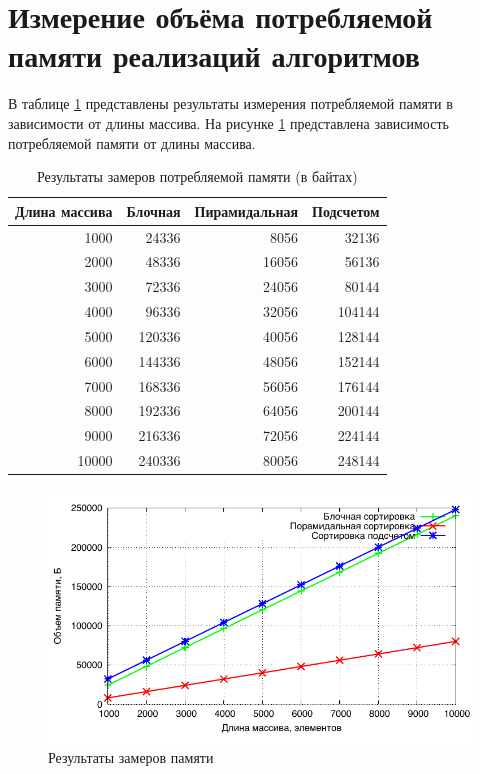 \section{Измерение объёма потребляемой памяти реализаций алгоритмов}

В таблице \ref{table:memory} представлены результаты измерения потребляемой памяти в зависимости от длины массива. На рисунке \ref{img:memory} представлена зависимость потребляемой памяти от длины массива.

\begin{table}[h]
  \caption{\label{table:memory} Результаты замеров потребляемой памяти (в байтах)}
  \begin{center}
    \begin{tabular}{|r|r|r|r|}
      \hline
      Длина массива & Блочная & Пирамидальная & Подсчетом\\ \hline
1000 & 24336 & 8056 & 32136 \\ \hline 
2000 & 48336 & 16056 & 56136 \\ \hline 
3000 & 72336 & 24056 & 80144 \\ \hline 
4000 & 96336 & 32056 & 104144 \\ \hline 
5000 & 120336 & 40056 & 128144 \\ \hline 
6000 & 144336 & 48056 & 152144 \\ \hline 
7000 & 168336 & 56056 & 176144 \\ \hline 
8000 & 192336 & 64056 & 200144 \\ \hline 
9000 & 216336 & 72056 & 224144 \\ \hline 
10000 & 240336 & 80056 & 248144 \\ \hline 

    \end{tabular}
  \end{center}
\end{table}

\noindent
\begin{figure}[h!]
	\centering
    \includegraphics[width=0.7\linewidth]{../data/memory.pdf}
    \caption{Результаты замеров памяти}
    \label{img:memory}
\end{figure}

\newpage